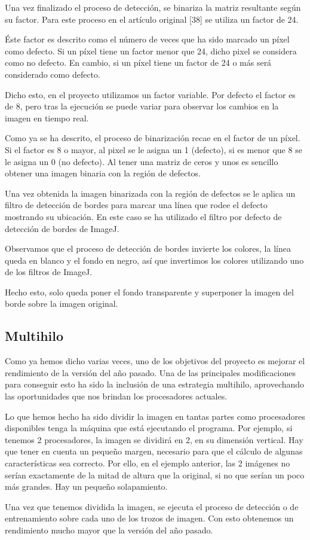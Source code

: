 Una vez finalizado el proceso de detección, se binariza la matriz resultante según su factor. Para este proceso en el artículo original [38] se utiliza un factor de 24.

Éste factor es descrito como el número de veces que ha sido marcado un píxel como defecto. Si un píxel tiene un factor menor que 24, dicho pixel se considera como no defecto. En cambio, si un píxel tiene un factor de 24 o más será considerado como defecto.

Dicho esto, en el proyecto utilizamos un factor variable. Por defecto el factor es de 8, pero tras la ejecución se puede variar para observar los cambios en la imagen en tiempo real.

Como ya se ha descrito, el proceso de binarización recae en el factor de un píxel. Si el factor es 8 o mayor, al pixel se le asigna un 1 (defecto), si es menor que 8 se le asigna un 0 (no defecto). Al tener una matriz de ceros y unos es sencillo obtener una imagen binaria con la región de defectos.


Una vez obtenida la imagen binarizada con la región de defectos se le aplica un filtro de detección de bordes para marcar una línea que rodee el defecto mostrando su ubicación. En este caso se ha utilizado el filtro por defecto de detección de bordes de ImageJ.

Observamos que el proceso de detección de bordes invierte los colores, la línea queda en blanco y el fondo en negro, así que invertimos los colores utilizando uno de los filtros de ImageJ.

Hecho esto, solo queda poner el fondo transparente y superponer la imagen del borde sobre la imagen original.

\subsection{Multihilo}
Como ya hemos dicho varias veces, uno de los objetivos del proyecto es mejorar el rendimiento de la versión del año pasado. Una de las principales modificaciones para conseguir esto ha sido la inclusión de una estrategia multihilo, aprovechando las oportunidades que nos brindan los procesadores actuales.

Lo que hemos hecho ha sido dividir la imagen en tantas partes como procesadores disponibles tenga la máquina que está ejecutando el programa. Por ejemplo, si tenemos 2 procesadores, la imagen se dividirá en 2, en su dimensión vertical. Hay que tener en cuenta un pequeño margen, necesario para que el cálculo de algunas características sea correcto. Por ello, en el ejemplo anterior, las 2 imágenes no serían exactamente de la mitad de altura que la original, si no que serían un poco más grandes. Hay un pequeño solapamiento.

Una vez que tenemos dividida la imagen, se ejecuta el proceso de detección o de entrenamiento sobre cada uno de los trozos de imagen. Con esto obtenemos un rendimiento mucho mayor que la versión del año pasado.